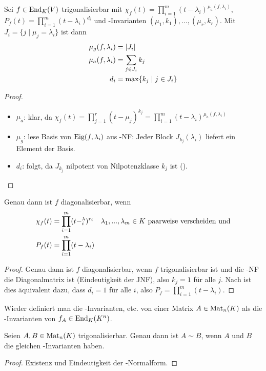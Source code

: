 \begin{conclusion}
	Sei $f\in\operatorname{End}_K(V)$ trigonalisierbar mit $\chi_f(t)=\prod_{i=1}^m (t-\lambda_i)^{\mu_a(f,\lambda_i)}$, $P_f(t)=\prod_{i=1}^m (t-\lambda_i)^{d_i}$ und -Invarianten $(\mu_1,k_1),...,(\mu_r,k_r)$. Mit $J_i=\{j\mid \mu_j=\lambda_i\}$ ist dann 
	\begin{align}
		\mu_g(f,\lambda_i)&= \vert J_i \vert \notag \\
		\mu_a(f,\lambda_i) &= \sum_{j\in J_i} k_j\notag \\
		d_i&= \max\{k_j\mid j\in J_i\}\notag
	\end{align}
\end{conclusion}
\begin{proof}
	\begin{itemize}
		\item $\mu_a$: klar, da $\chi_f(t)=\prod_{j=1}^r (t-\mu_j)^{k_j}=\prod_{i=1}^m (t-\lambda_i)^{\mu_a(f,\lambda_i)}$
		\item $\mu_g$: lese Basis von $\operatorname{Eig}(f,\lambda_i)$ aus -NF: Jeder Block $J_{k_j}(\lambda_i)$ liefert ein Element der Basis.
		\item $d_i$: folgt, da $J_{k_j}$ nilpotent von Nilpotenzklasse $k_j$ ist ().
	\end{itemize}
\end{proof}

\begin{conclusion}
	Genau dann ist $f$ diagonalisierbar, wenn 
	\begin{align}
		\chi_f(t)&=\prod_{i=1}^m (t-^\lambda_i)^{r_i}\quad \lambda_1,...,\lambda_m\in K\text{ paarweise verscheiden und} \notag \\
		P_f(t) &= \prod_{i=1}^m (t-\lambda_i)\notag
	\end{align}
\end{conclusion}
\begin{proof}
	Genau dann ist $f$ diagonalisierbar, wenn $f$ trigonalisierbar ist und die -NF die Diagonalmatrix ist (Eindeutigkeit der JNF), also $k_j=1$ für alle $j$. Nach  ist dies äquivalent dazu, dass $d_i=1$ für alle $i$, also $P_f=\prod_{i=1}^m (t-\lambda_i)$.
\end{proof}

\begin{remark}
	Wieder definiert man die -Invarianten, etc. von einer Matrix $A\in\operatorname{Mat}_n(K)$ als die -Invarianten von $f_A\in\operatorname{End}_K(K^n)$.
\end{remark}

\begin{conclusion}
	Seien $A,B\in\operatorname{Mat}_n(K)$ trigonalisierbar. Genau dann ist $A\sim B$, wenn $A$ und $B$ die gleichen -Invarianten haben.
\end{conclusion}
\begin{proof}
	Existenz und Eindeutigkeit der -Normalform.
\end{proof}